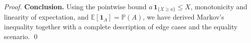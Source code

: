 \begin{proof}
\medskip
\textbf{Conclusion.}  
Using the pointwise bound $a\,\mathbf 1_{\{X\ge a\}}\le X$, monotonicity and linearity of expectation, and $\mathbb{E}[\mathbf 1_A]=\mathbb{P}(A)$, we have derived Markov’s inequality together with a complete description of edge cases and the equality scenario. \qed
\end{proof}